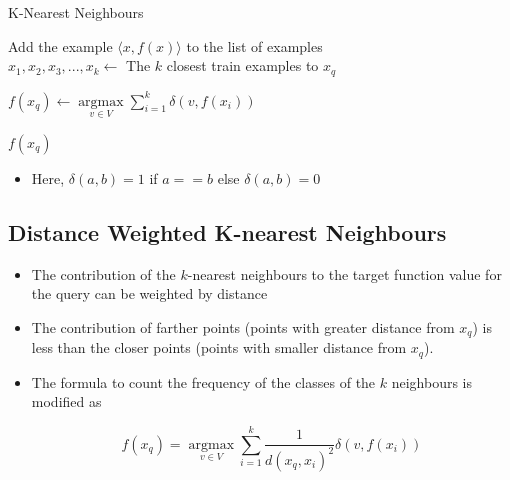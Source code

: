 \documentclass{article}
\theoremstyle{plain}
\theoremstyle{definition}
\begin{document}
\begin{algorithm}
    \caption{K-Nearest Neighbours}
    \begin{algorithmic}
            \State Add the example $\langle x, f(x) \rangle$ to the list of examples
        \EndProcedure\\
            \State $x_1, x_2, x_3, ..., x_k \gets  $ The $k$ closest train examples to $x_q$
            
            \State $f(x_q) \gets \operatorname*{argmax}\limits_{v \in V}  \sum\limits_{i=1}^{k} \delta(v, f(x_i))$
            
            \Return $f(x_ q)$
        \EndProcedure
    \end{algorithmic}
\end{algorithm}

\begin{itemize}
    \item Here, $\delta(a, b) = 1$ if $a==b$ else $\delta(a, b) = 0$
\end{itemize}
\subsection{Distance Weighted K-nearest Neighbours }

\begin{itemize}
    \item The contribution of the $k$-nearest neighbours to the target function value for the query can be weighted by distance
    
    \item The contribution of farther points (points with greater distance from $x_q$) is less than the closer points (points with smaller distance from $x_q$).
    
    \item The formula to count the frequency of the classes of the $k$ neighbours is modified as
    
    \begin{equation}
        f(x_q) =  \operatorname*{argmax}\limits_{v \in V}  \sum\limits_{i=1}^{k} \frac{1}{d(x_q, x_i)^2}\delta(v, f(x_i))
    \end{equation}
\end{itemize}
\end{document}
